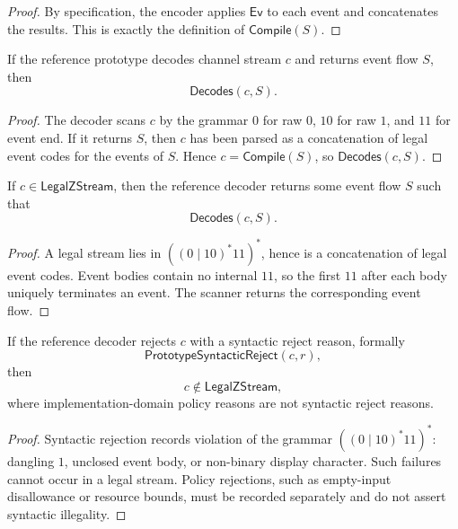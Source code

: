 \begin{proof}
By specification, the encoder applies $\mathsf{Ev}$ to each event and concatenates the results. This is exactly the definition of $\mathsf{Compile}(S)$.
\end{proof}

\begin{theorem}
\label{thm:minimal-prototype-decoder-soundness}
If the reference prototype decodes channel stream $c$ and returns event flow $S$, then
$$
  \mathsf{Decodes}(c,S).
$$
\end{theorem}

\begin{proof}
The decoder scans $c$ by the grammar $0$ for raw $0$, $10$ for raw $1$, and $11$ for event end. If it returns $S$, then $c$ has been parsed as a concatenation of legal event codes for the events of $S$. Hence $c=\mathsf{Compile}(S)$, so $\mathsf{Decodes}(c,S)$.
\end{proof}

\begin{theorem}
\label{thm:minimal-prototype-decoder-completeness}
If $c\in\mathsf{LegalZStream}$, then the reference decoder returns some event flow $S$ such that
$$
  \mathsf{Decodes}(c,S).
$$
\end{theorem}

\begin{proof}
A legal stream lies in $((0\mid 10)^{\ast}11)^{\ast}$, hence is a concatenation of legal event codes. Event bodies contain no internal $11$, so the first $11$ after each body uniquely terminates an event. The scanner returns the corresponding event flow.
\end{proof}

\begin{theorem}
\label{thm:minimal-prototype-reject-soundness}
If the reference decoder rejects $c$ with a syntactic reject reason, formally
$$
  \mathsf{PrototypeSyntacticReject}(c,r),
$$
then
$$
  c\notin\mathsf{LegalZStream},
$$
where implementation-domain policy reasons are not syntactic reject reasons.
\end{theorem}

\begin{proof}
Syntactic rejection records violation of the grammar $((0\mid 10)^{\ast}11)^{\ast}$: dangling $1$, unclosed event body, or non-binary display character. Such failures cannot occur in a legal stream. Policy rejections, such as empty-input disallowance or resource bounds, must be recorded separately and do not assert syntactic illegality.
\end{proof}

